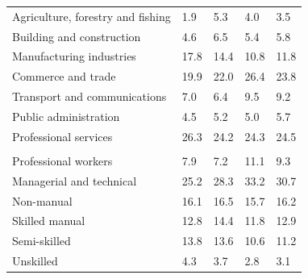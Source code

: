 \documentclass{article}
\begin{document}
\begin{table}[h]
\begin{tabular}{KTTTT}
    \hline
Agriculture, forestry and fishing  & 1.9& 5.3& 4.0& 3.5\\
Building and construction & 4.6& 6.5& 5.4& 5.8\\
Manufacturing industries & 17.8& 14.4& 10.8& 11.8\\
Commerce and trade  & 19.9& 22.0& 26.4& 23.8\\
Transport and communications  & 7.0& 6.4& 9.5& 9.2\\
Public administration & 4.5& 5.2& 5.0& 5.7\\
Professional services & 26.3& 24.2& 24.3& 24.5\\
\hline
    \\ 
    \hline
Professional workers  &  7.9&  7.2 & 11.1&  9.3\\
Managerial and technical & 25.2& 28.3& 33.2& 30.7\\
Non-manual & 16.1& 16.5& 15.7& 16.2\\
Skilled manual & 12.8& 14.4& 11.8& 12.9\\
Semi-skilled & 13.8& 13.6& 10.6& 11.2\\
Unskilled  & 4.3& 3.7& 2.8& 3.1\\
\end{tabular}
\end{table}
\pagebreak
\end{document}

